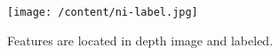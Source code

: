 \begin{figure}
	[h] \centering 
	\texttt{[image: /content/ni-label.jpg]} \caption{Features are located in depth image and labeled. \cite{13}} \label{fg:ni:label} 
\end{figure}
